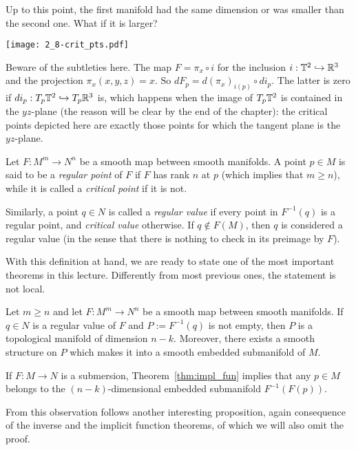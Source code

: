 Up to this point, the first manifold had the same dimension or was smaller than the second one.
What if it is larger?

\begin{marginfigure}
  \texttt{[image: 2\_8-crit\_pts.pdf]}
  \caption{Beware of the subtleties here. The map $F=\pi_x\circ i$ for the inclusion $i:\mathbb{T}^2\hookrightarrow\mathbb{R}^3$ and the projection $\pi_x(x,y,z)=x$.
  So $dF_p = d (\pi_x)_{i(p)} \circ d i_p$. The latter is zero if $d i_p: T_p\mathbb{T}^2\hookrightarrow T_p\mathbb{R}^3$ is, which happens when the image of $T_p\mathbb{T}^2$ is contained in the $yz$-plane (the reason will be clear by the end of the chapter): the critical points depicted here are exactly those points for which the tangent plane is the $yz$-plane.}
\end{marginfigure}
\begin{definition}
  Let $F:M^m \to N^n$ be a smooth map between smooth manifolds.
  A point $p\in M$ is said to be a \emph{regular point} of $F$ if $F$ has rank $n$ at $p$ (which implies that $m\geq n$), while it is called a \emph{critical point} if it is not.

  Similarly, a point $q\in N$ is called a \emph{regular value} if every point in $F^{-1}(q)$ is a regular point, and \emph{critical value} otherwise. If $q\not\in F(M)$, then $q$ is considered a regular value (in the sense that there is nothing to check in its preimage by $F$).
\end{definition}

With this definition at hand, we are ready to state one of the most important theorems in this lecture. Differently from most previous ones, the statement is not local.

\begin{theorem}\label{thm:impl_fun}
  Let $m\geq n$ and let $F: M^m \to N^n$ be a smooth map between smooth manifolds.
  If $q\in N$ is a regular value of $F$ and $P := F^{-1}(q)$ is not empty, then $P$ is a topological manifold of dimension $n-k$. 
  Moreover, there exists a smooth structure on $P$ which makes it into a smooth embedded submanifold of $M$.
\end{theorem}

\begin{remark}
  If $F:M\to N$ is a submersion, Theorem~\ref{thm:impl_fun} implies that any $p\in M$ belongs to the $(n-k)$-dimensional embedded submanifold $F^{-1}(F(p))$.
\end{remark}

From this observation follows another interesting proposition, again consequence of the inverse and the implicit function theorems, of which we will also omit the proof.

